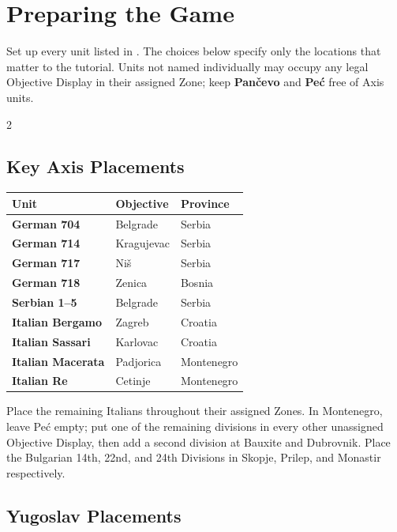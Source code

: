 \playbookbreak
\section{Preparing the Game}

\begin{lessonbox}
Set up every unit listed in . The choices below specify
only the locations that matter to the tutorial. Units not named individually
may occupy any legal Objective Display in their assigned Zone; keep
\textbf{Pančevo} and \textbf{Peć} free of Axis units.
\end{lessonbox}

\begin{multicols}{2}
\small
\subsection{Key Axis Placements}

\begin{tabularx}{\linewidth}{@{}>{\bfseries}l X l@{}}
  \rowcolor{TitoInk!15}
  Unit & \textbf{Objective} & \textbf{Province} \\
  \midrule
  German 704 & Belgrade & Serbia \\
  German 714 & Kragujevac & Serbia \\
  German 717 & Niš & Serbia \\
  German 718 & Zenica & Bosnia \\
  Serbian 1--5 & Belgrade & Serbia \\
  Italian Bergamo & Zagreb & Croatia \\
  Italian Sassari & Karlovac & Croatia \\
  Italian Macerata & Padjorica & Montenegro \\
  Italian Re & Cetinje & Montenegro \\
\end{tabularx}

Place the remaining Italians throughout their assigned Zones. In Montenegro,
leave Peć empty; put one of the remaining divisions in every other unassigned
Objective Display, then add a second division at Bauxite and Dubrovnik. Place
the Bulgarian 14th, 22nd, and 24th Divisions in Skopje, Prilep, and Monastir
respectively.

\subsection{Yugoslav Placements}


\end{multicols}
